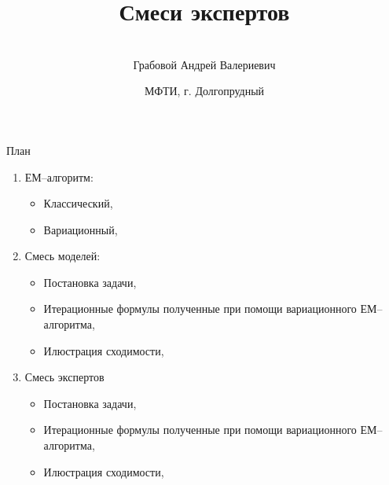 \documentclass[9pt,pdf,hyperref={unicode}]{beamer}
\title[\hbox to 56mm{Смесь экспертов \hfill\insertframenumber\,/\,\inserttotalframenumber}]
{Смеси экспертов}
\author[А.\,В.~Грабовой]{\large \\Грабовой Андрей Валериевич}
\institute{\large
Московский физико-технический институт}
\date{\footnotesize{МФТИ, г. Долгопрудный}}
\begin{document}
\begin{frame}
\titlepage
\end{frame}

\begin{frame}{План}
	\begin{enumerate}
		\item ЕМ--алгоритм:
			\begin{itemize}
				\item Классический,
				\item Вариационный,
			\end{itemize}
		\item Смесь моделей:
			\begin{itemize}
				\item Постановка задачи,
				\item Итерационные формулы полученные при помощи вариационного ЕМ--алгоритма,
				\item Илюстрация сходимости,
			\end{itemize}
		\item Смесь экспертов
			\begin{itemize}
				\item Постановка задачи,
				\item Итерационные формулы полученные при помощи вариационного ЕМ--алгоритма,
				\item Илюстрация сходимости,
			\end{itemize}
	\end{enumerate}
\end{frame}
\end{document}
